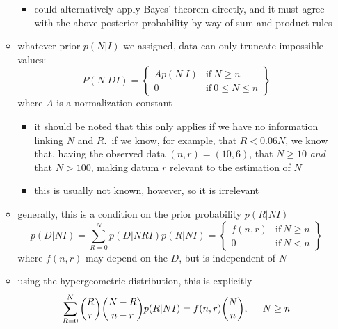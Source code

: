 \documentclass[../jaynes_prob_theory_notes.tex]{subfiles}
\begin{document}
\begin{itemize}
\begin{itemize}
                    \begin{itemize}
                        \item could alternatively apply Bayes' theorem directly, and it must agree with the above posterior probability by way of sum and product rules
                    \end{itemize}
                \item whatever prior $p(N|I)$ we assigned, data can only truncate impossible values:
                    \begin{equation*}
                        P(N|DI) = \left \{ \begin{matrix} Ap(N|I) & \mathrm{if}~N\geq n \\ 0 & \mathrm{if}~0\leq N \leq n \end{matrix} \right \}
                    \end{equation*}
                where $A$ is a normalization constant
                    \begin{itemize}
                        \item it should be noted that this only applies if we have no information linking $N$ and $R$.\ if we know, for example, that $R < 0.06N$, we know that, having the observed data $(n,r) = (10, 6)$, that $N \geq 10$ \textit{and} that $N > 100$, making datum $r$ relevant to the estimation of $N$
                        \item this is usually not known, however, so it is irrelevant
                    \end{itemize}
                \item generally, this is a condition on the prior probability $p(R|NI)$
                    \begin{equation*}
                        p(D|NI) = \sum^{N}_{R=0}p(D|NRI)p(R|NI) = \left \{ \begin{matrix} f(n,r) & \mathrm{if}~N\geq n \\ 0 & \mathrm{if}~N<n \end{matrix} \right \}
                    \end{equation*}
                where $f(n,r)$ may depend on the $D$, but is independent of $N$
                \item using the hypergeometric distribution, this is explicitly
                    \begin{equation}
                        \label{int_eq}
                        \sum^{N}_{R=0} \binom{R}{r} \binom{N-R}{n-r}p(R|NI) = f(n,r) \binom{N}{n}, \hspace{0.5cm} N \geq n

\end{equation}
\end{itemize}
\end{itemize}
\end{document}
